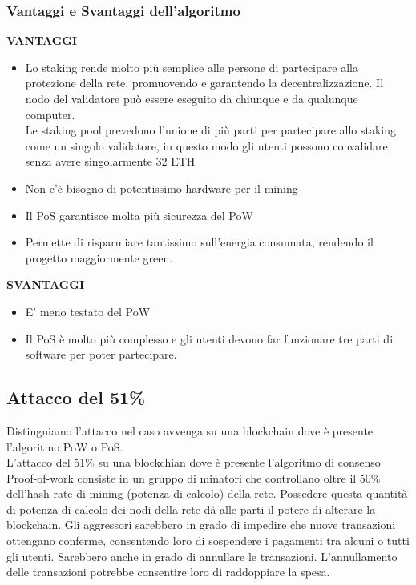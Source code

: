 \documentclass[a4paper,11pt]{report}
\begin{document}
\subsubsection{Vantaggi e Svantaggi dell'algoritmo}
\textbf{VANTAGGI}\\
\begin{itemize}
\item Lo staking rende molto più semplice alle persone di partecipare alla protezione della rete, promuovendo e garantendo la decentralizzazione. Il nodo del validatore può essere eseguito da chiunque e da qualunque computer.\\ Le staking pool prevedono l’unione di più parti per partecipare allo staking come un singolo validatore, in questo modo gli utenti possono convalidare senza avere singolarmente 32 ETH
\item Non c'è bisogno di potentissimo hardware per il mining
\item Il PoS garantisce molta più sicurezza del PoW
\item Permette di risparmiare tantissimo sull'energia consumata, rendendo il progetto maggiormente green.
\end{itemize}
\textbf{SVANTAGGI}
\begin{itemize}
\item E' meno testato del PoW
\item Il PoS è molto più complesso e gli utenti devono far funzionare tre parti di software per poter partecipare.
\end{itemize}


\subsection{Attacco del 51\%}
Distinguiamo l'attacco nel caso avvenga su una blockchain dove è presente l'algoritmo PoW o PoS.\\
L'attacco del 51\% su una blockchian dove è presente l'algoritmo di consenso Proof-of-work consiste in un gruppo di minatori che controllano oltre il 50\% dell'hash rate di mining (potenza di calcolo) della rete. Possedere questa quantità di potenza di calcolo dei nodi della rete dà alle parti il potere di alterare la blockchain.
Gli aggressori sarebbero in grado di impedire che nuove transazioni ottengano conferme, consentendo loro di sospendere i pagamenti tra alcuni o tutti gli utenti. Sarebbero anche in grado di annullare le transazioni. L'annullamento delle transazioni potrebbe consentire loro di raddoppiare la spesa. \\
\end{document}
